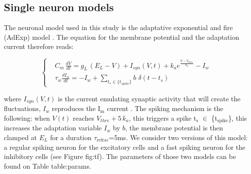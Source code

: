 \documentclass[8pt, colorlinks, a4paper]{article}
\renewcommand\ref{}
\begin{document}
\subsection{Single neuron models}
\label{sec-3-1}

The neuronal model used in this study is the adaptative exponential
and fire (AdExp) model \cite{Brette2005a}. The equation for the
membrane potential and the adaptation current therefore reads:

\begin{equation}
  \label{eq:iAdExp}
  \left\{
    \begin{split}
      & C_m\,\frac{dV}{dt} = g_{L} \,(E_{L}-V) + I_{syn}(V,t) + k_a e^{\frac{V - V_{thre} }{k_a}}- I_w \\
      & \tau_w \frac{d I_w}{dt} = - I_w + \sum_{t_s \in \{t_{spike}\}}
      b \, \, \delta (t-t_s)
    \end{split}
  \right.
\end{equation}

where $I_{syn}(V, t)$ is the current emulating synaptic activity that
will create the fluctuations, $I_w$ reproduces the I$_{\text{m}}$
current \cite{McCormick1985}. The spiking mechanism is the following:
when $V(t)$ reaches \(V_{thre}+5 \, k_a \), this triggers a spike
t$_{\text{s}}$ $\in$ \{t$_{\text{spike}}$\}, this increases the
adaptation variable $I_w$ by \(b\), the membrane potential is then
clamped at \(E_L\) for a duration
$\tau$$_{\text{refrac}}$=5ms. We consider two versions of this model:
a regular spiking neuron for the excitatory cells and a fast spiking
neuron for the inhibitory cells (see Figure \ref{fig:tf}). The
parameters of those two models can be found on Table
\ref{table:params}.
\end{document}
